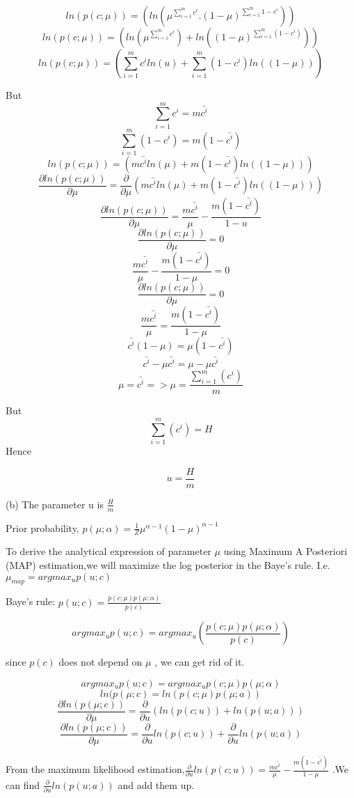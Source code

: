 \documentclass[a4paper, 12pt]{article}
\begin{document}
$$ln(p(c;\mu)) = \left(ln(\mu^{\sum_{i=1}^m c^{i}}. (1-\mu)^{\sum_{i=1}^{m} 1-c^i})\right)$$
$$ln(p(c;\mu)) = \left(ln(\mu^{\sum_{i=1}^m c^{i}}) + ln((1-\mu)^{\sum_{i=1}^{m} (1-c^i)})\right)$$
$$ln(p(c;\mu)) = \left(\sum_{i=1}^m c^{i}ln(u) + \sum_{i=1}^{m} (1-c^i)ln((1-\mu))\right)$$

But
$$\sum_{i=1}^m c^{i} = m\bar{c^i}$$
$$\sum_{i=1}^m (1-c^{i}) = m\left(1-\bar{c^i}\right) $$
$$ln(p(c;\mu)) = \left(m\bar{c^i}ln(\mu) + m\left(1-\bar{c^i}\right)ln((1-\mu))\right)$$
$$ \frac{\partial ln(p(c;\mu))}{\partial \mu}
   = \frac{\partial}{\partial \mu} \left(m\bar{c^i}ln(\mu) + m\left(1-\bar{c^i}\right)ln((1-\mu))\right)$$ 
$$ \frac{\partial ln(p(c;\mu))}{\partial \mu}
   =  \frac{m\bar{c^i}}{\mu} - \frac{m\left(1-\bar{c^i}\right)}{1-u}$$
$$ \frac{\partial ln(p(c;\mu))}{\partial \mu} = 0$$
$$ \frac{m\bar{c^i}}{\mu} - \frac{m\left(1-\bar{c^i}\right)}{1-\mu} = 0$$   
$$ \frac{\partial ln(p(c;\mu))}{\partial \mu} = 0$$
$$ \frac{m\bar{c^i}}{\mu} = \frac{m\left(1-\bar{c^i}\right)}{1-\mu} $$ 
$$\bar{c^i}\left(1-\mu\right) = \mu\left(1-\bar{c^i}\right)$$ 
$$\bar{c^i} - \mu\bar{c^i} = \mu - \mu\bar{c^i}$$
$$\mu = \bar{c^i}  => \mu = \frac{\sum_{i=1}^m \left( c^ i\right)}{m}$$ 

But
$$\sum_{i=1}^m \left( c^ i\right) = H $$
Hence 

$$u = \frac{H}{m}$$

(b) The parameter u is $\frac{H}{m}$

Prior probability,  $p(\mu;\alpha) = \frac{1}{Z}\mu^{\alpha - 1} \left(1-\mu\right)^{\alpha -1}$

To derive the analytical expression
of parameter $\mu $ using Maximum A Posteriori (MAP) estimation,we will maximize the log posterior in the Baye's rule. I.e. $\mu_{map} = argmax_u p(u;c)$

Baye's rule: $p(u;c) = \frac{p(c;\mu)p(\mu;\alpha)}{p(c)}$

$$argmax_u p(u;c)= argmax_u \left(\frac{p(c;\mu)p(\mu;\alpha)}{p(c)}\right)$$

since $p(c)$ does not depend on $\mu$ , we can get rid of it. 

$$argmax_u p(u;c)= argmax_u p(c;\mu)p(\mu;\alpha)$$
$$ln(p(\mu; c) = ln(p(c;\mu)p(\mu;a))$$
$$ \frac{\partial ln(p(\mu;c))}{\partial \mu}
   =  \frac{\partial}{\partial u} \left(ln(p(c;u)) +ln(p(u;a))\right)$$
$$ \frac{\partial ln(p(\mu;c))}{\partial \mu}
   =  \frac{\partial}{\partial u} ln(p(c;u)) + \frac{\partial}{\partial u} ln(p(u;a))$$
   
From the maximum likelihood estimation,$\frac{\partial}{\partial u} ln(p(c;u))= \frac{m\bar{c^i}}{\mu} - \frac{m\left(1-\bar{c^i}\right)}{1-\mu}$ .We can find $\frac{\partial}{\partial u} ln(p(u;a))$ and add them up. 
\end{document}
